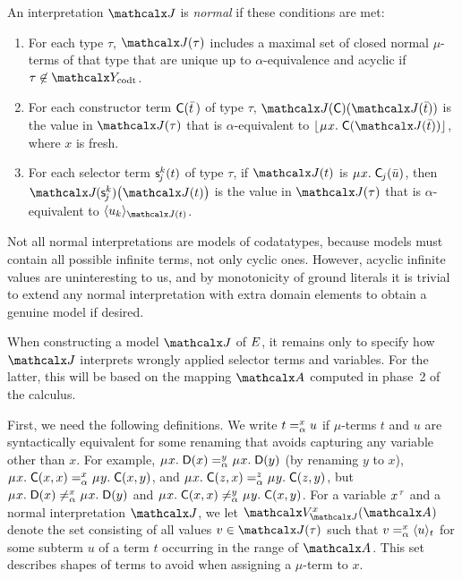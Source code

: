 \begin{definition}
\afterDot%
\label{def:norm-interpretation}%
\rm
An interpretation $\J$ is \emph{normal} if these conditions are met:
\begin{enumerate}
\item
For each type $\tau$,
$\interp{\J}{\tau}$ includes a maximal set of closed normal $\mu$-terms of that type that are
unique up to $\alpha$-equivalence and acyclic if $\tau \not\in \Codata$.
\item
For each constructor term $\const{C}( \vec t \,)$ of type $\tau$,
$\interp{\J}{\const{C}}( \interp{\J}{\vec t} )$ is the value
in $\interp{\J}{\tau}$ that is $\alpha$-equivalent to
$\nf{\MU x.\; \const{C}( \interp{\J}{\vec t} )}$, where $x$ is fresh.
\item
For each selector term $\const s^k_{\negvthinspace j}( t )$ of type $\tau$, %
if $\interp{\J}{t}$ is $\MU x.\; \const{C}_{\negvthinspace j}( \vec u )$,
then $\J\negvvthinspace( \const s^k_{\negvthinspace j} )\bigl( \interp{\J}{t} \bigr)$ is the value
in $\interp{\J}{\tau}$ that is $\alpha$-equivalent to
$\expand{\interp{\J}{t}}{u_k}$.
\end{enumerate}
\end{definition}

Not all normal interpretations are models of codatatypes, because
models must contain all possible infinite terms, not only cyclic ones. However,
acyclic infinite values are uninteresting to us, and by monotonicity of ground
literals it is trivial to extend any normal interpretation with extra
domain elements to obtain a genuine model if desired. %

When constructing a model $\J$ of $\Ec$,
it remains only to specify how $\J$ interprets wrongly applied selector terms and variables.
For the latter, this will be based on the mapping $\Val$ computed in phase~2 of the calculus.

{
First, we need the following definitions.
We write $t \vsimv{x} u$ if $\mu$-terms $t$ and $u$ are syntactically equivalent
for some renaming that avoids capturing any variable other than $x$.
For example,
$\MU x.\; \const{D}( x ) \vsimv{y} \MU x.\; \const{D}( y )$
(by renaming $y$ to $x$),
$\MU x.\; \const{C}( x, x ) \vsimv{x} \MU y.\; \const{C}( x, y )$, and
$\MU x.\; \const{C}( z, x ) \vsimv{z} \MU y.\; \const{C}( z, y )$,
but
$\MU x.\; \const{D}( x ) \not\vsimv{x} \MU x.\; \const{D}( y )$ and
$\MU x.\; \const{C}( x, x ) \not\vsimv{y} \MU y.\; \const{C}( x, y )$.
For a variable $x\typ{\tau}$ and a normal interpretation $\J$,
we let $\BAD_{\smash{\J}}^x( \Val )$ denote the set consisting of all values
$v \in \interp{\J}{\tau}$
such that $v \vsimv{x} \expand{t}{u}$ for some subterm $u$ of a term $t$
occurring in the range of $\Val$. This set describes shapes of terms to avoid
when assigning a $\mu$-term to $x$.

}

